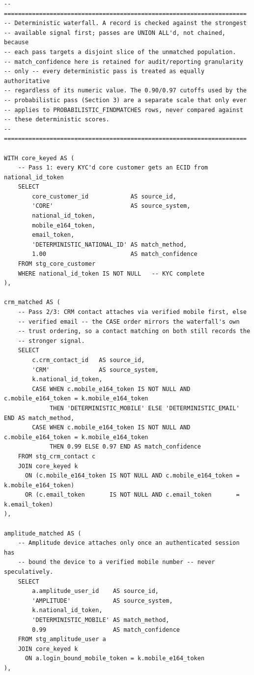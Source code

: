 \documentclass[11pt]{article}
\begin{document}
\begin{lstlisting}[language=PseudoSQL, style=codeblock]
-- =====================================================================
-- Deterministic waterfall. A record is checked against the strongest
-- available signal first; passes are UNION ALL'd, not chained, because
-- each pass targets a disjoint slice of the unmatched population.
-- match_confidence here is retained for audit/reporting granularity
-- only -- every deterministic pass is treated as equally authoritative
-- regardless of its numeric value. The 0.90/0.97 cutoffs used by the
-- probabilistic pass (Section 3) are a separate scale that only ever
-- applies to PROBABILISTIC_FINDMATCHES rows, never compared against
-- these deterministic scores.
-- =====================================================================

WITH core_keyed AS (
    -- Pass 1: every KYC'd core customer gets an ECID from national_id_token
    SELECT
        core_customer_id            AS source_id,
        'CORE'                      AS source_system,
        national_id_token,
        mobile_e164_token,
        email_token,
        'DETERMINISTIC_NATIONAL_ID' AS match_method,
        1.00                        AS match_confidence
    FROM stg_core_customer
    WHERE national_id_token IS NOT NULL   -- KYC complete
),

crm_matched AS (
    -- Pass 2/3: CRM contact attaches via verified mobile first, else
    -- verified email -- the CASE order mirrors the waterfall's own
    -- trust ordering, so a contact matching on both still records the
    -- stronger signal.
    SELECT
        c.crm_contact_id   AS source_id,
        'CRM'              AS source_system,
        k.national_id_token,
        CASE WHEN c.mobile_e164_token IS NOT NULL AND c.mobile_e164_token = k.mobile_e164_token
             THEN 'DETERMINISTIC_MOBILE' ELSE 'DETERMINISTIC_EMAIL' END AS match_method,
        CASE WHEN c.mobile_e164_token IS NOT NULL AND c.mobile_e164_token = k.mobile_e164_token
             THEN 0.99 ELSE 0.97 END AS match_confidence
    FROM stg_crm_contact c
    JOIN core_keyed k
      ON (c.mobile_e164_token IS NOT NULL AND c.mobile_e164_token = k.mobile_e164_token)
      OR (c.email_token       IS NOT NULL AND c.email_token       = k.email_token)
),

amplitude_matched AS (
    -- Amplitude device attaches only once an authenticated session has
    -- bound the device to a verified mobile number -- never speculatively.
    SELECT
        a.amplitude_user_id    AS source_id,
        'AMPLITUDE'            AS source_system,
        k.national_id_token,
        'DETERMINISTIC_MOBILE' AS match_method,
        0.99                   AS match_confidence
    FROM stg_amplitude_user a
    JOIN core_keyed k
      ON a.login_bound_mobile_token = k.mobile_e164_token
),


\end{lstlisting}
\end{document}
